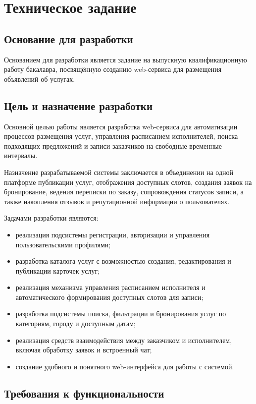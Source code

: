 \section{Техническое задание}

\subsection{Основание для разработки}

Основанием для разработки является задание на выпускную квалификационную работу бакалавра, посвящённую созданию web-сервиса для размещения объявлений об услугах.

\subsection{Цель и назначение разработки}

Основной целью работы является разработка web-сервиса для автоматизации процессов размещения услуг, управления расписанием исполнителей, поиска подходящих предложений и записи заказчиков на свободные временные интервалы.

Назначение разрабатываемой системы заключается в объединении на одной платформе публикации услуг, отображения доступных слотов, создания заявок на бронирование, ведения переписки по заказу, сопровождения статусов записи, а также накопления отзывов и репутационной информации о пользователях.

Задачами разработки являются:
\begin{itemize}
	\item реализация подсистемы регистрации, авторизации и управления пользовательскими профилями;
	\item разработка каталога услуг с возможностью создания, редактирования и публикации карточек услуг;
	\item реализация механизма управления расписанием исполнителя и автоматического формирования доступных слотов для записи;
	\item разработка подсистемы поиска, фильтрации и бронирования услуг по категориям, городу и доступным датам;
	\item реализация средств взаимодействия между заказчиком и исполнителем, включая обработку заявок и встроенный чат;
	\item создание удобного и понятного web-интерфейса для работы с системой.
\end{itemize}

\subsection{Требования к функциональности}

